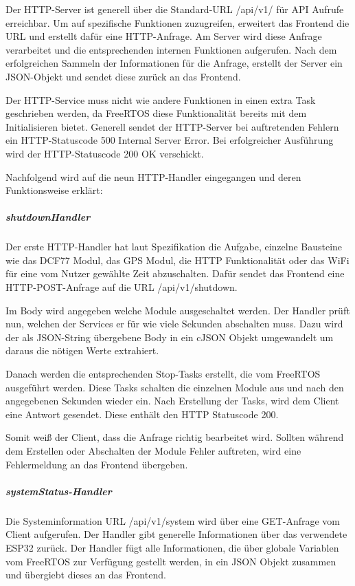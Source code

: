 Der HTTP-Server ist generell über die Standard-URL \glqq /api/v1/\grqq{} für API Aufrufe erreichbar. Um auf spezifische Funktionen zuzugreifen, erweitert das Frontend die URL und erstellt dafür eine HTTP-Anfrage.
Am Server wird diese Anfrage verarbeitet und die entsprechenden internen Funktionen aufgerufen. Nach dem erfolgreichen Sammeln der Informationen für die Anfrage, erstellt der Server ein JSON-Objekt und sendet diese zurück an das Frontend.

Der HTTP-Service muss nicht wie andere Funktionen in einen extra Task geschrieben werden, da FreeRTOS diese Funktionalität bereits mit dem Initialisieren bietet.
Generell sendet der HTTP-Server bei auftretenden Fehlern ein HTTP-Statuscode 500 \glqq Internal Server Error\grqq{}. Bei erfolgreicher Ausführung wird der HTTP-Statuscode 200 \glqq OK\grqq{} verschickt.

Nachfolgend wird auf die neun HTTP-Handler eingegangen und deren Funktionsweise erklärt:

\subparagraph{shutdownHandler} Der erste HTTP-Handler hat laut Spezifikation die Aufgabe, einzelne Bausteine wie das DCF77 Modul, das GPS Modul, die HTTP Funktionalität oder das WiFi für eine vom Nutzer gewählte Zeit abzuschalten.
Dafür sendet das Frontend eine HTTP-POST-Anfrage auf die URL \glqq /api/v1/shutdown\grqq{}.

Im Body wird angegeben welche Module ausgeschaltet werden. Der Handler prüft nun, welchen der Services er für wie viele Sekunden abschalten muss.
Dazu wird der als JSON-String übergebene Body in ein cJSON Objekt umgewandelt um daraus die nötigen Werte extrahiert.

Danach werden die entsprechenden \glqq Stop-Tasks\grqq{} erstellt, die vom FreeRTOS ausgeführt werden.
Diese Tasks schalten die einzelnen Module aus und nach den angegebenen Sekunden wieder ein. Nach Erstellung der Tasks, wird dem Client eine Antwort gesendet. Diese enthält den HTTP Statuscode 200.

Somit weiß der Client, dass die Anfrage richtig bearbeitet wird.
Sollten während dem Erstellen oder Abschalten der Module Fehler auftreten, wird eine Fehlermeldung an das Frontend übergeben.

\subparagraph{systemStatus-Handler} Die Systeminformation URL \glqq /api/v1/system\grqq{} wird über eine GET-Anfrage vom Client aufgerufen.
Der Handler gibt generelle Informationen über das verwendete ESP32 zurück.
Der Handler fügt alle Informationen, die über globale Variablen vom FreeRTOS zur Verfügung gestellt werden, in ein JSON Objekt zusammen und übergiebt dieses an das Frontend.

